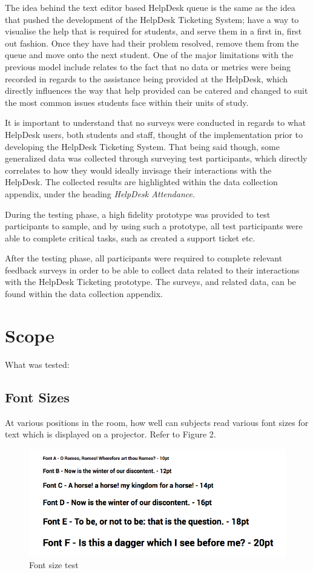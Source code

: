 \documentclass[12pt,a4paper,]{article}
\begin{document}
The idea behind the text editor based HelpDesk queue is the same as the
idea that pushed the development of the HelpDesk Ticketing System; have
a way to visualise the help that is required for students, and serve
them in a first in, first out fashion. Once they have had their problem
resolved, remove them from the queue and move onto the next student. One
of the major limitations with the previous model include relates to the
fact that no data or metrics were being recorded in regards to the
assistance being provided at the HelpDesk, which directly influences the
way that help provided can be catered and changed to suit the most
common issues students face within their units of study.

It is important to understand that no surveys were conducted in regards
to what HelpDesk users, both students and staff, thought of the
implementation prior to developing the HelpDesk Ticketing System. That
being said though, some generalized data was collected through surveying
test participants, which directly correlates to how they would ideally
invisage their interactions with the HelpDesk. The collected results are
highlighted within the data collection appendix, under the heading
\emph{HelpDesk Attendance}.

During the testing phase, a high fidelity prototype was provided to test
participants to sample, and by using such a prototype, all test
participants were able to complete critical tasks, such as created a
support ticket etc.

After the testing phase, all participants were required to complete
relevant feedback surveys in order to be able to collect data related to
their interactions with the HelpDesk Ticketing prototype. The surveys,
and related data, can be found within the data collection appendix.

\section{Scope}\label{scope}

What was tested:

\subsection{Font Sizes}\label{font-sizes}

At various positions in the room, how well can subjects read various
font sizes for text which is displayed on a projector. Refer to Figure
2.

\begin{figure}[htbp]
\centering
\includegraphics{2.png}
\caption{Font size test}
\end{figure}
\end{document}
